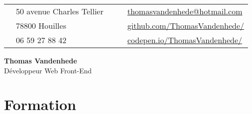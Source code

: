 \documentclass[10pt, a4paper]{article}
\def\GithubIcon{{\FA \faGithub}}
\def\CodepenIcon{{\FA \faCodepen}}
\def\EnvelopeIcon{{\FA \faEnvelopeO}}
\def\MapMarkerIcon{{\FA \faMapMarker}}
\def\PhoneIcon{{\FA \faPhone}}
\begin{document}
\begin{minipage}[t]{\textwidth}
	\begin{tabularx}{\linewidth}{@{}l l X c l@{}}
		\MapMarkerIcon	& 50 avenue Charles Tellier		& & \EnvelopeIcon	& \href{mailto:thomasvandenhede@hotmail.com}{thomasvandenhede@hotmail.com}\\
						& 78800 Houilles				& & \GithubIcon		& \href{https://github.com/ThomasVandenhede/}{github.com/ThomasVandenhede/}\\
		\PhoneIcon		& 06 59 27 88 42				& & \CodepenIcon	& \href{https://codepen.io/ThomasVandenhede/}{codepen.io/ThomasVandenhede/}\\
	\end{tabularx}
\end{minipage}
\bigskip


\begin{center}
	\Huge \textbf{Thomas Vandenhede}\smallskip\\
	\LARGE Développeur Web Front-End\bigskip
\end{center}

\section{Formation}
\begin{education}
\end{education}
\end{document}
